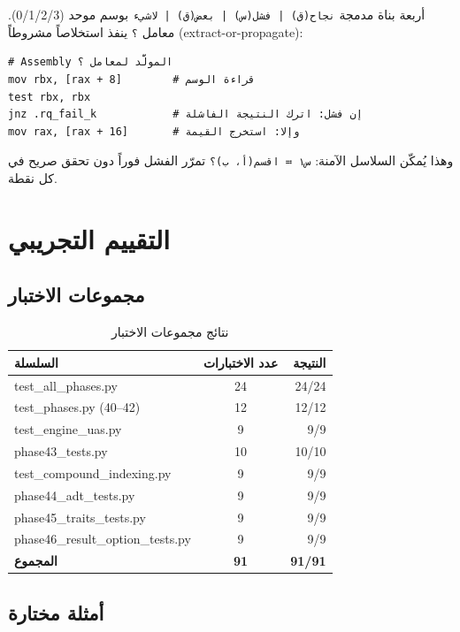 \documentclass[sigconf]{acmart}
\begin{document}
أربعة بناة مدمجة \texttt{نجاح(ق) | فشل(س) | بعض(ق) | لاشيء} بوسم موحد
(0/1/2/3). معامل \texttt{؟} ينفذ استخلاصاً مشروطاً (extract-or-propagate):

\begin{lstlisting}[style=arlang]
# Assembly المولَّد لمعامل ؟
mov rbx, [rax + 8]        # قراءة الوسم
test rbx, rbx
jnz .rq_fail_k            # إن فشل: اترك النتيجة الفاشلة
mov rax, [rax + 16]       # وإلا: استخرج القيمة
\end{lstlisting}

وهذا يُمكّن السلاسل الآمنة: \texttt{س١ ≔ اقسم(أ، ب)؟} تمرّر الفشل فوراً دون
تحقق صريح في كل نقطة.

\section{التقييم التجريبي}
\label{sec:evaluation}

\subsection{مجموعات الاختبار}
\label{sec:evaluation:suites}

\begin{table}[h]
\centering
\caption{نتائج مجموعات الاختبار}
\label{tab:suites}
\begin{tabular}{lcr}
\toprule
\textbf{السلسلة} & \textbf{عدد الاختبارات} & \textbf{النتيجة} \\
\midrule
test\_all\_phases.py & 24 & 24/24 \\
test\_phases.py (40–42) & 12 & 12/12 \\
test\_engine\_uas.py & 9 & 9/9 \\
phase43\_tests.py & 10 & 10/10 \\
test\_compound\_indexing.py & 9 & 9/9 \\
phase44\_adt\_tests.py & 9 & 9/9 \\
phase45\_traits\_tests.py & 9 & 9/9 \\
phase46\_result\_option\_tests.py & 9 & 9/9 \\
\midrule
\textbf{المجموع} & \textbf{91} & \textbf{91/91} \\
\bottomrule
\end{tabular}
\end{table}

\subsection{أمثلة مختارة}
\label{sec:evaluation:examples}
\end{document}

